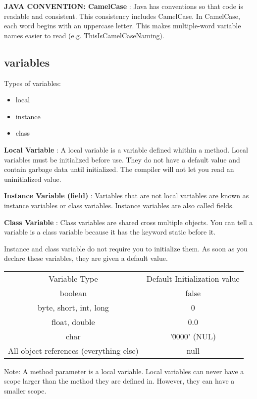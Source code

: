 \documentclass{article}
\begin{document}
\textbf{JAVA CONVENTION: CamelCase} : Java has conventions so that code is readable and consistent. This consistency includes CamelCase. In CamelCase, each word begins with an uppercase letter. This makes multiple-word variable names easier to read (e.g. ThisIsCamelCaseNaming).

\subsection{variables}
Types of variables:
\begin{itemize}
	\item local
	\item instance
	\item class
\end{itemize}


\textbf{Local Variable} : A local variable is a variable defined whithin a method. Local variables must be initialized before use. They do not have a default value and contain garbage data until initialized. The compiler will not let you read an uninitialized value.

\textbf{Instance Variable (field)} : Variables that are not local variables are known as instance variables or class variables. Instance variables are also called fields.

\textbf{Class Variable} : Class variables are shared cross multiple objects. You can tell a variable is a class variable because it has the keyword static before it.

Instance and class variable do not require you to initialize them. As soon as you declare these variables, they are given a default value.


\begin{tabular}{|c|c|}
	\cline{1-2}
	    Variable Type & Default Initialization value \\
	\cline{1-2}
	    boolean & false \\
	    byte, short, int, long & 0 \\
	    float, double & 0.0 \\
	    char & '\u0000' (NUL) \\
	    All object references (everything else) & null \\

	\cline{1-2}
\end{tabular}

Note: A method parameter is a local variable.
Local variables can never have a scope larger than the method they are defined in. However, they can have a smaller scope.
\end{document}
